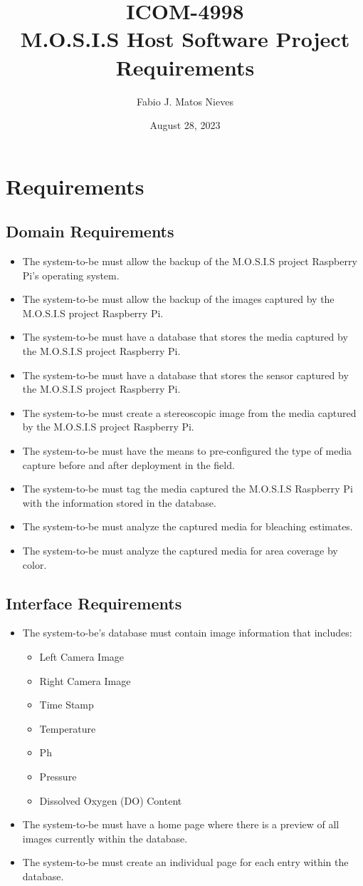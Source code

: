 \documentclass{article}
\title{ICOM-4998\\ M.O.S.I.S Host Software Project Requirements}
\author{Fabio J. Matos Nieves}
\date{August 28, 2023}
\begin{document}
\maketitle
\section{Requirements}
\subsection{Domain Requirements}
\begin{itemize}
	\item The system-to-be must allow the backup of the M.O.S.I.S project Raspberry Pi's operating system.
	\item The system-to-be must allow the backup of the images captured by the M.O.S.I.S project Raspberry Pi.
	\item The system-to-be must have a database that stores the media captured by the M.O.S.I.S project Raspberry Pi.
	\item The system-to-be must have a database that stores the sensor captured by the M.O.S.I.S project Raspberry Pi.
	\item The system-to-be must create a stereoscopic image from the media captured by the M.O.S.I.S project Raspberry Pi.
	\item The system-to-be must have the means to pre-configured the type of media capture before and after deployment in the field.
	\item The system-to-be must tag the media captured the M.O.S.I.S Raspberry Pi with the information stored in the database.
	\item The system-to-be must analyze the captured media for bleaching estimates.
	\item The system-to-be must analyze the captured media for area coverage by color.
\end{itemize}
\subsection{Interface Requirements}
\begin{itemize}
	\item The system-to-be's database must contain image information that includes:
	      \begin{itemize}
		      \item Left Camera Image
		      \item Right Camera Image
		      \item Time Stamp
		      \item Temperature
		      \item Ph
		      \item Pressure
		      \item Dissolved Oxygen (DO) Content
	      \end{itemize}
	\item The system-to-be must have a home page where there is a preview of all images currently within the database.
	\item The system-to-be must create an individual page for each entry within the database.
\end{itemize}
\end{document}
